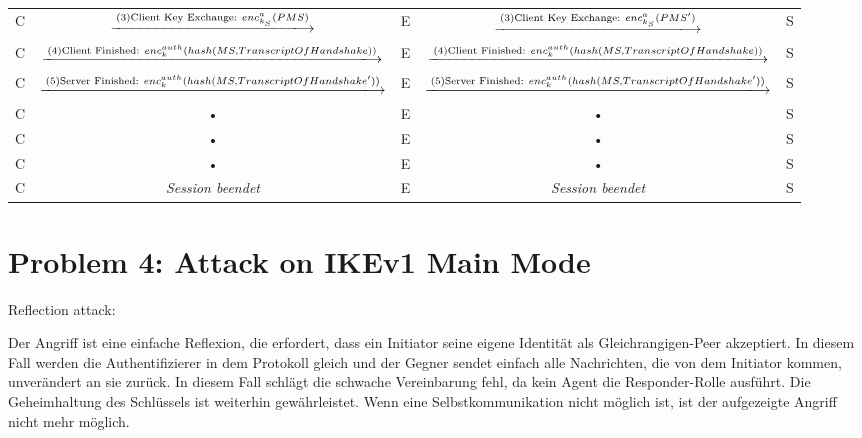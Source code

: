 \documentclass[12pt,pdftex,a4paper]{article}
\begin{document}
\begin{sidewaystable}[ph!]
\begin{tabular}{|c|c|c|c|c|}
		C &  $\xlongrightarrow{\text{(3)Client Key Exchange: } enc^{a}_{k_{S}}(PMS)}$  & E &  $\xlongrightarrow{\text{(3)Client Key Exchange: } enc^{a}_{k_{S}}(PMS')}$  & S \\ 
		
		C &  $\xlongrightarrow{\text{(4)Client Finished: } enc_{k}^{auth}(hash(MS, TranscriptOfHandshake))}$  & E &  $\xlongrightarrow{\text{(4)Client Finished: } enc_{k}^{auth}(hash(MS, TranscriptOfHandshake))}$  & S \\ 
		
		C &  $\xlongrightarrow{\text{(5)Server Finished: } enc_{k}^{auth}(hash(MS, TranscriptOfHandshake'))}$ & E &  $\xlongrightarrow{\text{(5)Server Finished: } enc_{k}^{auth}(hash(MS, TranscriptOfHandshake'))}$ & S \\ 
		C & • & E & • & S \\ 
		C & • & E & • & S \\ 
		C & • & E & • & S \\ 
		C & \textit{Session beendet} & E & \textit{Session beendet} & S \\ 
	\end{tabular} 
\end{sidewaystable}
\clearpage

\section*{Problem 4: Attack on IKEv1 Main Mode}
Reflection attack:

Der Angriff ist eine einfache Reflexion, die erfordert, dass ein Initiator seine eigene Identität als Gleichrangigen-Peer akzeptiert. In diesem Fall werden die Authentifizierer in dem Protokoll gleich und der Gegner sendet einfach alle Nachrichten, die von dem Initiator kommen, unverändert an sie zurück. In diesem Fall schlägt die schwache Vereinbarung fehl, da kein Agent die Responder-Rolle ausführt. Die Geheimhaltung des Schlüssels ist weiterhin gewährleistet. Wenn eine Selbstkommunikation nicht möglich ist, ist der aufgezeigte Angriff nicht mehr möglich.
\end{document}
